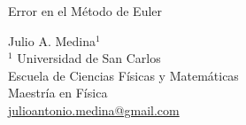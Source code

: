 \documentclass[a4paper]{article}
\begin{document}

\Large
 \begin{center}
Error en el Método de Euler\\


\hspace{10pt}

\large
Julio A. Medina$^1$ \\
\hspace{10pt}
\small  
$^1$ Universidad de San Carlos\\
Escuela de Ciencias Físicas y Matemáticas\\
Maestría en Física\\
\href{mailto:julioantonio.medina@gmail.com}{julioantonio.medina@gmail.com}\\

\end{center}

\hspace{10pt}

\normalsize
\end{document}
